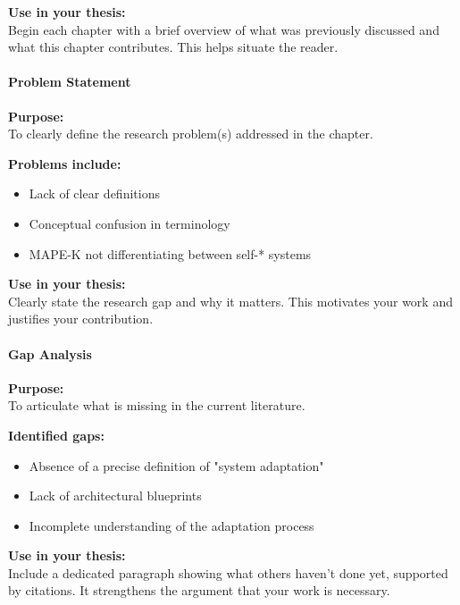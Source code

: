 \vspace{0.5em}
\textbf{Use in your thesis:} \\
Begin each chapter with a brief overview of what was previously discussed and what this chapter contributes. This helps situate the reader.

\paragraph{Problem Statement}
\textbf{Purpose:} \\
To clearly define the research problem(s) addressed in the chapter.

\vspace{0.5em}
\textbf{Problems include:}
\begin{itemize}
    \item Lack of clear definitions
    \item Conceptual confusion in terminology
    \item MAPE-K not differentiating between self-* systems
\end{itemize}

\vspace{0.5em}
\textbf{Use in your thesis:} \\
Clearly state the research gap and why it matters. This motivates your work and justifies your contribution.

\paragraph{Gap Analysis}
\textbf{Purpose:} \\
To articulate what is missing in the current literature.

\vspace{0.5em}
\textbf{Identified gaps:}
\begin{itemize}
    \item Absence of a precise definition of "system adaptation"
    \item Lack of architectural blueprints
    \item Incomplete understanding of the adaptation process
\end{itemize}

\vspace{0.5em}
\textbf{Use in your thesis:} \\
Include a dedicated paragraph showing what others haven’t done yet, supported by citations. It strengthens the argument that your work is necessary.

